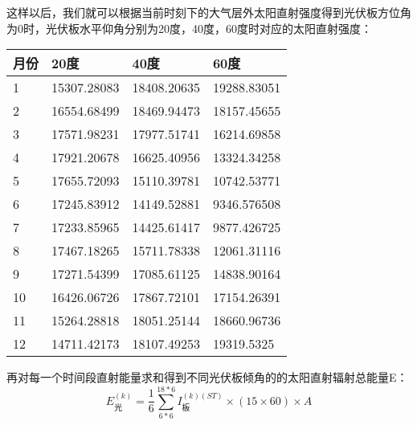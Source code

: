 \documentclass[withoutpreface,bwprint]{cumcmthesis} %
\begin{document}
这样以后，我们就可以根据当前时刻下的大气层外太阳直射强度得到光伏板方位角为0时，光伏板水平仰角分别为20度，40度，60度时对应的太阳直射强度：
\newpage
\begin{table}[!ht]
	\centering
	\begin{tabular}{|l|l|l|l|}
		\hline
		月份 & 20度 & 40度 & 60度  \\ \hline
		1 & 15307.28083 & 18408.20635 & 19288.83051  \\ \hline
		2 & 16554.68499 & 18469.94473 & 18157.45655  \\ \hline
		3 & 17571.98231 & 17977.51741 & 16214.69858  \\ \hline
		4 & 17921.20678 & 16625.40956 & 13324.34258  \\ \hline
		5 & 17655.72093 & 15110.39781 & 10742.53771  \\ \hline
		6 & 17245.83912 & 14149.52881 & 9346.576508  \\ \hline
		7 & 17233.85965 & 14425.61417 & 9877.426725  \\ \hline
		8 & 17467.18265 & 15711.78338 & 12061.31116  \\ \hline
		9 & 17271.54399 & 17085.61125 & 14838.90164  \\ \hline
		10 & 16426.06726 & 17867.72101 & 17154.26391  \\ \hline
		11 & 15264.28818 & 18051.25144 & 18660.96736  \\ \hline
		12 & 14711.42173 & 18107.49253 & 19319.5325  \\ \hline
	\end{tabular}
\end{table}

再对每一个时间段直射能量求和得到不同光伏板倾角的的太阳直射辐射总能量E：
\begin{equation}
	E_{\mbox{光}}^{(k)} = \frac{1}{6} \sum_{6*6}^{18*6} I_{\mbox{板}}^{(k)(ST)} \times (15 \times 60) \times A
	\label{eq:014}
\end{equation}
\end{document}
